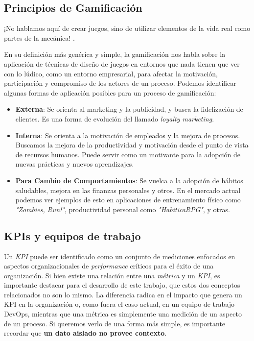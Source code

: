 \documentclass[journal]{IEEEtran}
\begin{document}
\subsection{\textbf{Principios de Gamificación}}

\begin{tcolorbox}[colback=gray!10, colframe=black, left=2mm, right=2mm]
    \small %
    \ttfamily %
    \raggedright %
    ¡No hablamos aquí de crear juegos, sino de utilizar elementos de la vida real como partes de la mecánica! \cite{nallar2015estructuraludica}.
\end{tcolorbox}

En su definición más genérica y simple, la gamificación nos habla sobre la aplicación de técnicas de diseño de juegos en entornos que nada tienen que ver con lo lúdico, como un entorno empresarial, para afectar la motivación, participación y compromiso de los actores de un proceso.
Podemos identificar algunas formas de aplicación posibles para un proceso de gamificación\cite[XVIII. Gamificación, fundamentos. Tipos de Gamificación.]{nallar2015estructuraludica}:
\begin{itemize}
    \item \textbf{Externa}: Se orienta al marketing y la publicidad, y busca la fidelización de clientes. Es una forma de evolución del llamado \textit{loyalty marketing}.
    \item \textbf{Interna}: Se orienta a la motivación de empleados y la mejora de procesos. Buscamos la mejora de la productividad y motivación desde el punto de vista de recursos humanos. Puede servir como un motivante para la adopción de nuevas prácticas y nuevos aprendizajes.
    \item \textbf{Para Cambio de Comportamientos}: Se vuelca a la adopción de hábitos saludables, mejora en las finanzas personales y otros. En el mercado actual podemos ver ejemplos de esto en aplicaciones de entrenamiento físico como \textit{"Zombies, Run!"}, productividad personal como \textit{"HabiticaRPG"}, y otras.
\end{itemize}

\subsection{\textbf{KPIs y equipos de trabajo}}

Un \textit{KPI} puede ser identificado como un conjunto de mediciones enfocados en aspectos organizacionales de \textit{performance} críticos para el éxito de una organización\cite{heilbrunn2019gamification}.
Si bien existe una relación entre una \textit{métrica} y un \textit{KPI}, es importante destacar para el desarrollo de este trabajo, que estos dos conceptos relacionados no son lo mismo. La diferencia radica en el impacto que genera un KPI en la organización o, como fuera el caso actual, en un equipo de trabajo DevOps, mientras que una métrica es simplemente una medición de un aspecto de un proceso. Si queremos verlo de una forma más simple, es importante recordar que \textbf{un dato aislado no provee contexto}.
\end{document}

